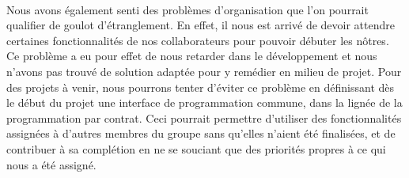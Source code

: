     \paragraph{}
        Nous avons également senti des problèmes d'organisation que l'on 
        pourrait qualifier de goulot d'étranglement.
        En effet, il nous est arrivé de devoir attendre certaines
        fonctionnalités de nos collaborateurs pour pouvoir débuter les nôtres.
        Ce problème a eu pour effet de nous retarder dans le développement et
        nous n'avons pas trouvé de solution adaptée pour y remédier en milieu
        de projet.
        Pour des projets à venir, nous pourrons tenter d'éviter ce problème en
        définissant dès le début du projet une interface de programmation
        commune, dans la lignée de la programmation par contrat.
        Ceci pourrait permettre d'utiliser des fonctionnalités assignées à 
        d'autres membres du groupe sans qu'elles n'aient été finalisées, et de
        contribuer à sa complétion en ne se souciant que des priorités propres
        à ce qui nous a été assigné.

